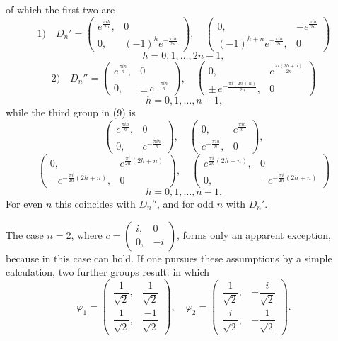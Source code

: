 of which the first two are
\[
1)\quad D_n' = \begin{pmatrix} e^{\frac{\pi i h}{2n}}, & 0 \\ 0, & (-1)^h e^{-\frac{\pi i h}{2n}} \end{pmatrix},\quad
\begin{pmatrix} 0, & -e^{\frac{\pi i h}{2n}} \\ (-1)^{h+n} e^{-\frac{\pi i h}{2n}}, & 0 \end{pmatrix}
\]
\[
h = 0, 1, \ldots, 2n-1,
\]
\[
2)\quad D_n'' = \begin{pmatrix} e^{\frac{\pi i h}{n}}, & 0 \\ 0, & \pm\, e^{-\frac{\pi i h}{n}} \end{pmatrix},\quad
\begin{pmatrix} 0, & e^{\frac{\pi i (2h+n)}{2n}} \\ \pm\, e^{-\frac{\pi i (2h+n)}{2n}}, & 0 \end{pmatrix}
\]
\[
h = 0, 1, \ldots, n-1\text{,}
\]
while the third group in (9) is
\[
\begin{pmatrix} e^{\frac{\pi i h}{n}}, & 0 \\ 0, & e^{-\frac{\pi i h}{n}} \end{pmatrix},\quad
\begin{pmatrix} 0, & e^{\frac{\pi i h}{n}} \\ e^{-\frac{\pi i h}{n}}, & 0 \end{pmatrix},
\]
\[
\begin{pmatrix} 0, & e^{\frac{\pi i}{2n}(2h+n)} \\ -e^{-\frac{\pi i}{2n}(2h+n)}, & 0 \end{pmatrix},\quad
\begin{pmatrix} e^{\frac{\pi i}{2n}(2h+n)}, & 0 \\ 0, & -e^{-\frac{\pi i}{2n}(2h+n)} \end{pmatrix}
\]
\[
h = 0, 1, \ldots, n-1\text{.}
\]
For even $n$ this coincides with $D_n''$, and for odd $n$ with $D_n'$.

The case $n=2$, where $c = \begin{pmatrix} i, & 0 \\ 0, & -i \end{pmatrix}$, forms only an apparent exception, because in this case
can hold. If one pursues these assumptions by a simple calculation, two further groups result:
in which
\[
\varphi_1 = \begin{pmatrix} \dfrac{1}{\sqrt2}, & \dfrac{1}{\sqrt2} \\ \dfrac{1}{\sqrt2}, & \dfrac{-1}{\sqrt2} \end{pmatrix},\quad
\varphi_2 = \begin{pmatrix} \dfrac{1}{\sqrt2}, & -\dfrac{i}{\sqrt2} \\ \dfrac{i}{\sqrt2}, & -\dfrac{1}{\sqrt2} \end{pmatrix}.
\]

